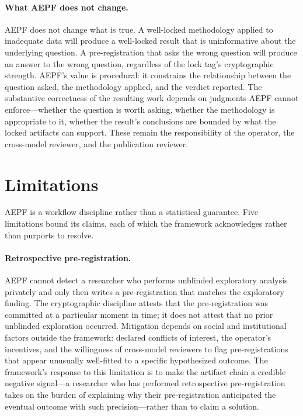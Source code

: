 \documentclass[11pt]{article}
\begin{document}
\paragraph{What AEPF does not change.}
AEPF does not change what is true. A well-locked methodology
applied to inadequate data will produce a well-locked result that
is uninformative about the underlying question. A pre-registration
that asks the wrong question will produce an answer to the wrong
question, regardless of the lock tag's cryptographic strength.
AEPF's value is procedural: it constrains the relationship between
the question asked, the methodology applied, and the verdict
reported. The substantive correctness of the resulting work
depends on judgments AEPF cannot enforce---whether the question is
worth asking, whether the methodology is appropriate to it,
whether the result's conclusions are bounded by what the locked
artifacts can support. These remain the responsibility of the
operator, the cross-model reviewer, and the publication reviewer.

\section{Limitations}
\label{sec:limitations}

AEPF is a workflow discipline rather than a statistical guarantee.
Five limitations bound its claims, each of which the framework
acknowledges rather than purports to resolve.

\paragraph{Retrospective pre-registration.}
AEPF cannot detect a researcher who performs unblinded exploratory
analysis privately and only then writes a pre-registration that
matches the exploratory finding. The cryptographic discipline
attests that the pre-registration was committed at a particular
moment in time; it does not attest that no prior unblinded
exploration occurred. Mitigation depends on social and institutional
factors outside the framework: declared conflicts of interest, the
operator's incentives, and the willingness of cross-model reviewers
to flag pre-registrations that appear unusually well-fitted to a
specific hypothesized outcome. The framework's response to this
limitation is to make the artifact chain a credible negative
signal---a researcher who has performed retrospective pre-registration
takes on the burden of explaining why their pre-registration anticipated
the eventual outcome with such precision---rather than to claim a
solution.
\end{document}

